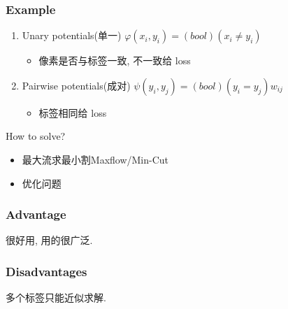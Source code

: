 \subsubsection{Example}
\begin{enumerate}
    \item Unary potentials(单一) $\varphi(x_i,y_i)=(bool)(x_i \ne y_i)$
    \begin{itemize}
        \item 像素是否与标签一致, 不一致给 loss
    \end{itemize}
    \item Pairwise potentials(成对) $\psi(y_i,y_j)=(bool)(y_i = y_j)w_{ij}$
    \begin{itemize}
        \item 标签相同给 loss
    \end{itemize}
\end{enumerate}

How to solve?
\begin{itemize}
    \item 最大流求最小割Maxflow/Min-Cut
    \item 优化问题
\end{itemize}

\subsubsection{Advantage}
很好用, 用的很广泛. 

\subsubsection{Disadvantages}
多个标签只能近似求解. 